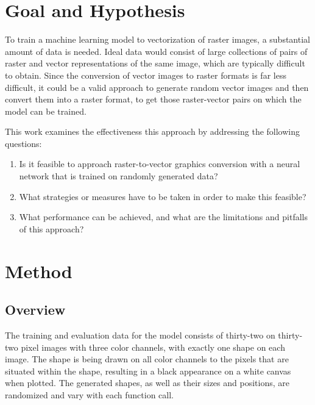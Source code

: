 \documentclass[12pt, a4paper, titlepage]{report}
\begin{document}



\chapter{Goal and Hypothesis}

To train a machine learning model to vectorization of raster images, a substantial amount of data is needed. Ideal data would consist of large collections of pairs of raster and vector representations of the same image, which are typically difficult to obtain. Since the conversion of vector images to raster formats is far less difficult, it could be a valid approach to generate random vector images and then convert them into a raster format, to get those raster-vector pairs on which the model can be trained.


This work examines the effectiveness this approach by addressing the following questions:

\begin{enumerate}[label=\Roman*.]
   \item Is it feasible to approach raster-to-vector graphics conversion with a neural network that is trained on randomly generated data?
   \item What strategies or measures have to be taken in order to make this feasible?
   \item What performance can be achieved, and what are the limitations and pitfalls of this approach?
\end{enumerate}





\chapter{Method}

\section{Overview}

The training and evaluation data for the model consists of thirty-two on thirty-two pixel images with three color channels, with exactly one shape on each image. The shape is being drawn on all color channels to the pixels that are situated within the shape, resulting in a black appearance on a white canvas when plotted. The generated shapes, as well as their sizes and positions, are randomized and vary with each function call.
\end{document}
